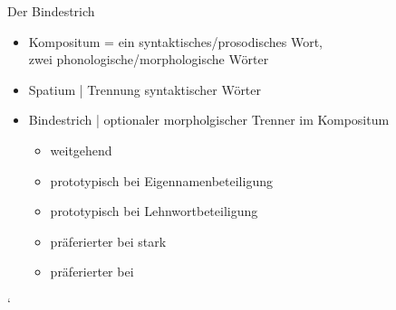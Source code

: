 \begin{frame}
  {Der Bindestrich}
  \onslide<+->
  \begin{itemize}[<+->]
    \item Kompositum = \alert{ein} syntaktisches\slash prosodisches Wort,\\
      \onslide<+->
      \alert{zwei} phonologische\slash morphologische Wörter
      \Halbzeile
    \item Spatium | Trennung syntaktischer Wörter
      \Zeile
    \item Bindestrich | optionaler morpholgischer Trenner im Kompositum
      \begin{itemize}[<+->]
        \item weitgehend 
        \item prototypisch bei \alert{Eigennamenbeteiligung}
        \item prototypisch bei \alert{Lehnwortbeteiligung}
        \item präferierter bei stark 
        \item präferierter bei 
      \end{itemize}
  \end{itemize}
\end{frame}

\begin{frame}
  {`}
  \onslide<+->
  \onslide<+->
  \begin{exe}
    \ex 
    \begin{xlist}
    \end{xlist}
    \ex 
    \begin{xlist}
    \end{xlist}
    \ex 
    \begin{xlist}
    \end{xlist}
    \ex 
    \begin{xlist}
    \end{xlist}
  \end{exe}
\end{frame}

